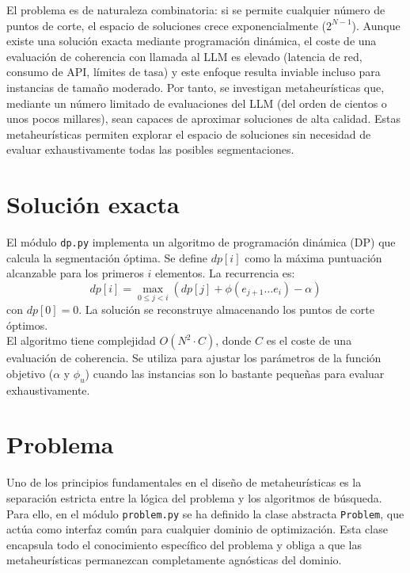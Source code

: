 \documentclass[letterpaper, 12pt]{report}
\begin{document}
El problema es de naturaleza combinatoria: si se permite cualquier número
de puntos de corte, el espacio de soluciones crece exponencialmente 
(\(2^{N-1}\)). Aunque existe una solución exacta mediante programación 
dinámica, el coste de una evaluación de coherencia con
llamada al LLM es elevado (latencia de red, consumo de API, límites de tasa)
y este enfoque resulta inviable incluso para instancias de tamaño moderado. 
Por tanto, se investigan metaheurísticas que, mediante un número limitado de evaluaciones del LLM (del orden de cientos o unos pocos millares), sean capaces de aproximar soluciones de alta calidad. Estas metaheurísticas permiten explorar el espacio de soluciones sin necesidad de evaluar exhaustivamente todas las posibles segmentaciones.


\section{Solución exacta}

El módulo \texttt{dp.py} implementa un algoritmo de programación dinámica (DP) que calcula la segmentación óptima. Se define \(dp[i]\) como la máxima puntuación alcanzable para los primeros \(i\) elementos. La recurrencia es:
\[
dp[i] = \max_{0 \le j < i} \left( dp[j] + \phi( e_{j+1}\dots e_i ) - \alpha \right)
\]
con \(dp[0]=0\). La solución se reconstruye almacenando los puntos de corte óptimos. \\

El algoritmo tiene complejidad \(O(N^2 \cdot C)\), donde \(C\) es el coste de una evaluación de coherencia. Se utiliza para ajustar los parámetros de la función objetivo (\(\alpha\) y \(\phi_u\)) cuando las instancias son lo bastante pequeñas para evaluar exhaustivamente.

\section{Problema}

Uno de los principios fundamentales en el diseño de metaheurísticas
es la separación estricta entre la lógica del problema y 
los algoritmos de búsqueda.
Para ello, en el módulo \texttt{problem.py} se ha definido la 
clase abstracta \texttt{Problem}, que actúa como interfaz 
común para cualquier dominio de optimización.
Esta clase encapsula todo el conocimiento específico del 
problema y obliga a que las metaheurísticas permanezcan 
completamente agnósticas del dominio. \\
\end{document}
